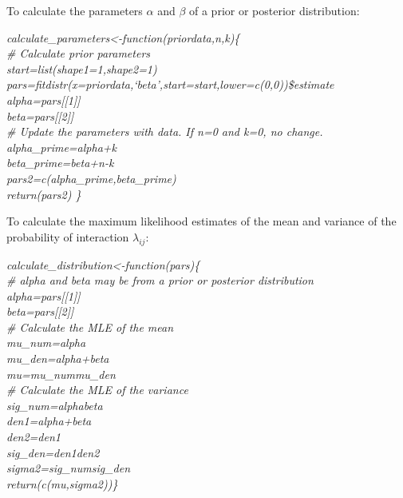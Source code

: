 \documentclass[12pt]{article}
\begin{document}
  To calculate the parameters $\alpha$ and $\beta$ of a prior or 
  posterior distribution:

  \vspace{12pt}
  \emph{
  \noindent \hspace{-4pt}calculate\_parameters\textless-function(priordata,n,k)\{\\
  \hspace{4pt} \# Calculate prior parameters\\
  \hspace{4pt} start=list(shape1=1,shape2=1)
  \hspace{80pt} pars=fitdistr(x=priordata,`beta',start=start,lower=c(0,0))\$estimate\\
  \hspace{4pt} alpha=pars[[1]]\\
  \hspace{4pt} beta=pars[[2]]\\
  \hspace{4pt} \# Update the parameters with data. If n=0 and k=0, no change.\\
  \hspace{4pt} alpha\_prime=alpha+k\\
  \hspace{4pt} beta\_prime=beta+n-k\\
  \hspace{4pt} pars2=c(alpha\_prime,beta\_prime)\\
  \hspace{4pt} return(pars2) \}
  }
  \vspace{12pt}


    To calculate the maximum likelihood estimates of the mean and 
    variance of the probability of interaction $\lambda_{ij}$:

    \vspace{12pt}
    \emph{
    calculate\_distribution\textless-function(pars)\{\\
      \# alpha and beta may be from a prior or posterior distribution\\
      alpha=pars[[1]]\\
      beta=pars[[2]]\\


      \# Calculate the MLE of the mean\\
      mu\_num=alpha\\
      mu\_den=alpha+beta\\
      mu=mu\_num\/mu\_den\\


      \# Calculate the MLE of the variance\\
      sig\_num=alpha\*beta\\
      den1=alpha+beta\\
      den2=den1\*\\
      sig\_den=den1\*den2\\
      sigma2=sig\_num\/sig\_den\\


      return(c(mu,sigma2))\}
    }
  \vspace{12pt}
      
\end{document}
